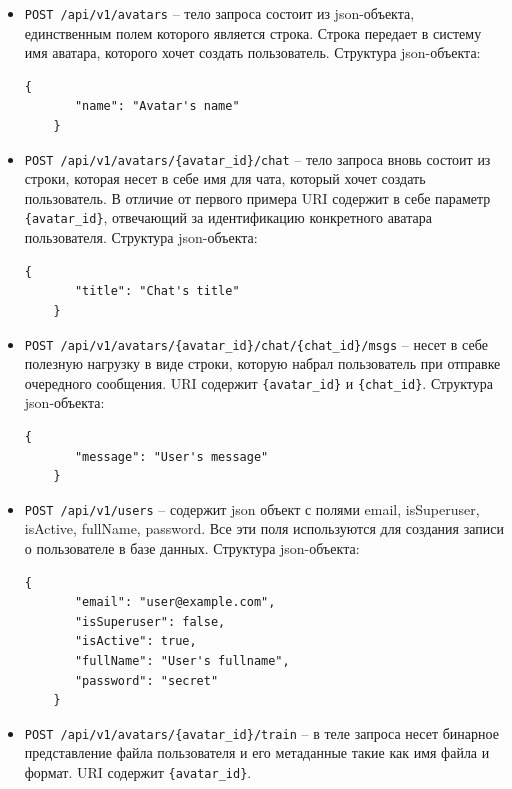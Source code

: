 \begin{itemize}
    \item \texttt{POST /api/v1/avatars} – тело запроса состоит из json-объекта, единственным полем которого является строка. Строка передает в систему имя аватара, которого хочет создать пользователь.\newline
    Структура json-объекта:
    \begin{lstlisting}[style=jsonstyle, numbers=none, frame=none]
    {
       "name": "Avatar's name"
    }
    \end{lstlisting}
    
    \item \texttt{POST /api/v1/avatars/\{avatar\_id\}/chat} – тело запроса вновь состоит из строки, которая несет в себе имя для чата, который хочет создать пользователь. В отличие от первого примера URI содержит в себе параметр \texttt{\{avatar\_id\}}, отвечающий за идентификацию конкретного аватара пользователя.\newline
    Структура json-объекта:
    \begin{lstlisting}[style=jsonstyle, numbers=none, frame=none]
    {
       "title": "Chat's title"
    }
    \end{lstlisting}

    \item \texttt{POST /api/v1/avatars/\{avatar\_id\}/chat/\{chat\_id\}/msgs} – несет в себе полезную нагрузку в виде строки, которую набрал пользователь при отправке очередного сообщения. URI содержит \texttt{\{avatar\_id\}} и \texttt{\{chat\_id\}}.\newline
    Структура json-объекта:
    \begin{lstlisting}[style=jsonstyle, numbers=none, frame=none]
    {
       "message": "User's message"
    }
    \end{lstlisting}

    \item \texttt{POST /api/v1/users} – содержит json объект с полями email, isSuperuser, isActive, fullName, password. Все эти поля используются для создания записи о пользователе в базе данных.\newline
    Структура json-объекта:
    \begin{lstlisting}[style=jsonstyle, numbers=none, frame=none]
    {
       "email": "user@example.com",
       "isSuperuser": false,
       "isActive": true,
       "fullName": "User's fullname",
       "password": "secret"
    }
    \end{lstlisting}

    \item \texttt{POST /api/v1/avatars/\{avatar\_id\}/train} – в теле запроса несет бинарное представление файла пользователя и его метаданные такие как имя файла и формат. URI содержит \texttt{\{avatar\_id\}}.
\end{itemize}

